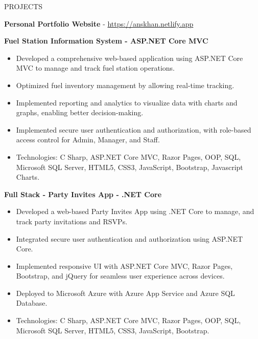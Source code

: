 \documentclass{resume} %
\begin{document}
\begin{rSection}{PROJECTS}
\vspace{-1.25em}
\item \textbf{Personal Portfolio Website}  - \href{https://anskhan.netlify.app}{https://anskhan.netlify.app}

\item \textbf{Fuel Station Information System - ASP.NET Core MVC}

\begin{itemize}
	\item Developed a comprehensive web-based application using ASP.NET Core MVC to manage and track fuel station operations.
	\item Optimized fuel inventory management by allowing real-time tracking.
	\item Implemented reporting and analytics to visualize data with charts and graphs, enabling better decision-making.
	
	\item Implemented secure user authentication and authorization, with role-based access control for Admin, Manager, and Staff.
	\item Technologies: C Sharp, ASP.NET Core MVC, Razor Pages, OOP, SQL, Microsoft SQL Server, HTML5, CSS3, JavaScript, Bootstrap, Javascript Charts.
\end{itemize}

\item \textbf{Full Stack - Party Invites App - .NET Core}
\begin{itemize}
	\item Developed a web-based Party Invites App using .NET Core to  manage, and track party invitations and RSVPs.
	\item Integrated secure user authentication and authorization using ASP.NET Core.
	\item Implemented responsive UI with ASP.NET Core MVC, Razor Pages, Bootstrap, and jQuery for seamless user experience across devices.
	
	\item Deployed to Microsoft Azure with Azure App Service and Azure SQL Database.
	\item Technologies: C Sharp, ASP.NET Core MVC, Razor Pages, OOP, SQL, Microsoft SQL Server, HTML5, CSS3, JavaScript, Bootstrap.
\end{itemize}




\end{rSection}
\end{document}
